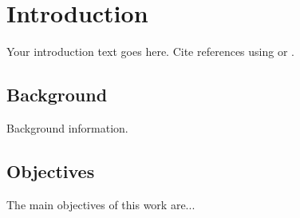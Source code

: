 \chapter{Introduction}
\label{ch:introduction}

Your introduction text goes here. Cite references using \textcite{example2026} or \parencite{example2026}.

\section{Background}
Background information.

\section{Objectives}
The main objectives of this work are...
